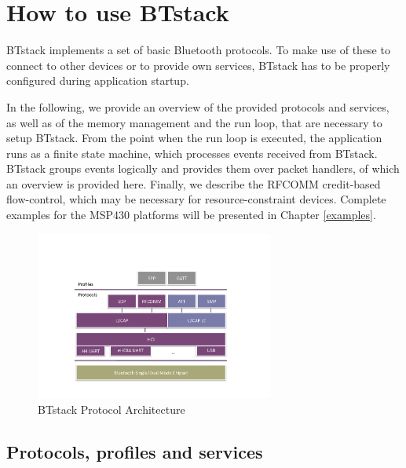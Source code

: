 \documentclass[a4paper,titlepage,oneside,12pt]{amsart} %
\begin{document}
\section{How to use BTstack}

BTstack implements a set of basic Bluetooth protocols. To make use of these to connect to other devices or to provide own services, BTstack has to be properly configured during application startup. 

In the following, we provide an overview of the provided protocols and services, as well as of the memory management and the run loop, that are necessary to setup BTstack. From the point when the run loop is executed, the application runs as a finite state machine, which processes events received from BTstack. BTstack groups events logically and provides them over packet handlers, of which an overview is provided here. Finally, we describe the RFCOMM credit-based flow-control, which may be necessary for resource-constraint devices. Complete examples for the MSP430 platforms will be presented in Chapter \ref{examples}. 

\begin{figure}[htbp] %
   \centering
   \includegraphics[width=0.7\textwidth]{picts/btstack-protocols.pdf} 
   \caption{BTstack Protocol Architecture}
   \label{fig:BTstackProtocolArchitecture}
\end{figure}

\subsection{Protocols, profiles and services}
\end{document}
